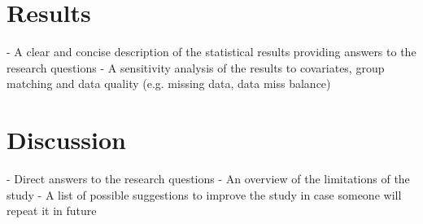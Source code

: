 \documentclass[]{article}
\begin{document}
\section{Results}

- A clear and concise description of the statistical results 
providing answers to the research questions
\newline
- A sensitivity analysis of the results to covariates, group  matching and data quality (e.g. missing data, data miss balance)

\section{Discussion}

- Direct answers to the research questions
\newline
- An overview of the limitations of the study
\newline
- A list of possible suggestions to improve the study in case 
someone will repeat it in future
\printbibliography
\end{document}
